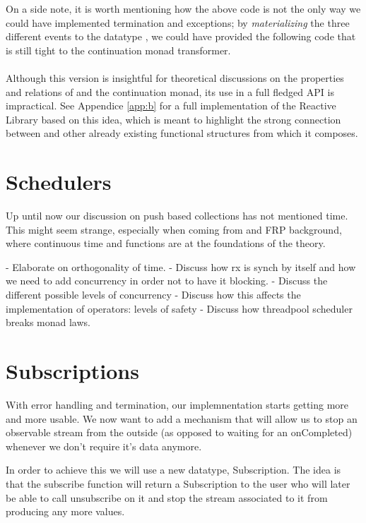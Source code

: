 On a side note, it is worth mentioning how the above code is not the only way we could have implemented termination and exceptions; by \textit{materializing} the three different events to the datatype , we could have provided the following code that is still tight to the continuation monad transformer.\\

\\

Although this version is insightful for theoretical discussions on the properties and relations of  and the continuation monad, its use in a full fledged API is impractical. See Appendice \ref{app:b} for a full implementation of the Reactive Library based on this idea, which is meant to highlight the strong connection between  and other already existing functional structures from which it composes. 


\section{Schedulers}

Up until now our discussion on push based collections has not mentioned time. This might seem strange, especially when coming from and FRP background, where continuous time and functions are at the foundations of the theory. 

- Elaborate on orthogonality of time.
- Discuss how rx is synch by itself and how we need to add concurrency in order not to have it blocking. 
- Discuss the different possible levels of concurrency
- Discuss how this affects the implementation of operators: levels of safety
- Discuss how threadpool scheduler breaks monad laws. 

\section{Subscriptions}

With error handling and termination, our implemnentation starts getting more and more usable. We now want to add a mechanism that will allow us to stop an observable stream from the outside (as opposed to waiting for an onCompleted) whenever we don't require it's data anymore. 

In order to achieve this we will use a new datatype, Subscription. The idea is that the subscribe function will return a Subscription to the user who will later be able to call unsubscribe on it and stop the stream associated to it from producing any more values.

